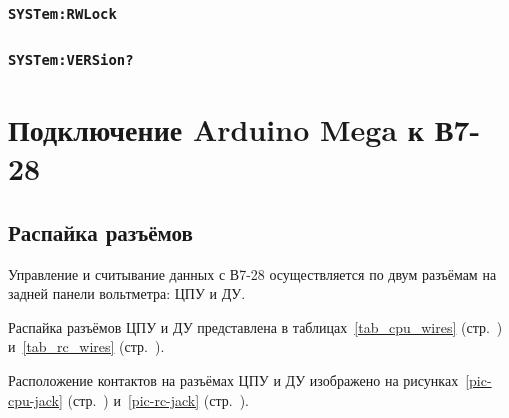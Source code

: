 \documentclass[12pt, a4paper]{article}
\newcommand{\V}{\mbox{В7-28}}
\newcommand{\Arduino}{Arduino Mega}
\newcommand{\CMD}[1]{{\tt #1}}
\newcommand{\CMDSECTION}[1]{\subsubsection*{\CMD{#1}}}
\begin{document}
\CMDSECTION{SYSTem:RWLock}
\CMDSECTION{SYSTem:VERSion?}

\section{Подключение {\Arduino} к \V}

\subsection{Распайка разъёмов}

Управление и считывание данных с {\V} осуществляется по двум разъёмам на задней панели вольтметра: ЦПУ и ДУ.

Распайка разъёмов ЦПУ и ДУ представлена в таблицах~\ref{tab_cpu_wires} (стр.~\pageref{tab_cpu_wires}) и~\ref{tab_rc_wires} (стр.~\pageref{tab_rc_wires}).

Расположение контактов на разъёмах ЦПУ и ДУ изображено на рисунках~\ref{pic-cpu-jack} (стр.~\pageref{pic-cpu-jack}) и~\ref{pic-rc-jack} (стр.~\pageref{pic-rc-jack}).
\end{document}
